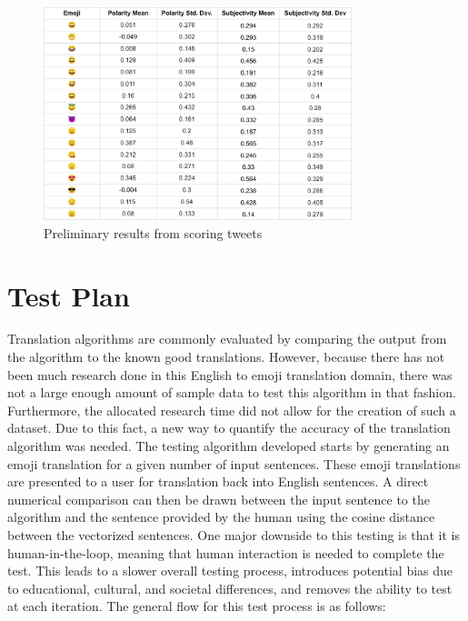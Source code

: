 \documentclass{article}[10]
\begin{document}
\begin{figure}[h]
  \begin{center}
    \includegraphics[width=0.80\textwidth]{figures/sentiment_results2.png}
    \caption{Preliminary results from scoring tweets\label{fig:tweetScoring}}
  \end{center}
\end{figure}


\section{Test Plan\label{sec:testPlan}}

Translation algorithms are commonly evaluated by comparing the output from the
algorithm to the known good translations. However, because there has not been
much research done in this English to emoji translation domain, there was not a
large enough amount of sample data to test this algorithm in that fashion.
Furthermore, the allocated research time did not allow for the creation of such
a dataset. Due to this fact, a new way to quantify the accuracy of the
translation algorithm was needed. The testing algorithm developed starts by
generating an emoji translation for a given number of input sentences. These
emoji translations are presented to a user for translation back into English
sentences. A direct numerical comparison can then be drawn between the input
sentence to the algorithm and the sentence provided by the human using the
cosine distance between the vectorized sentences. One major downside to this
testing is that it is human-in-the-loop, meaning that human interaction is
needed to complete the test. This leads to a slower overall testing process,
introduces potential bias due to educational, cultural, and societal
differences, and removes the ability to test at each iteration. The general flow
for this test process is as follows:
\end{document}
